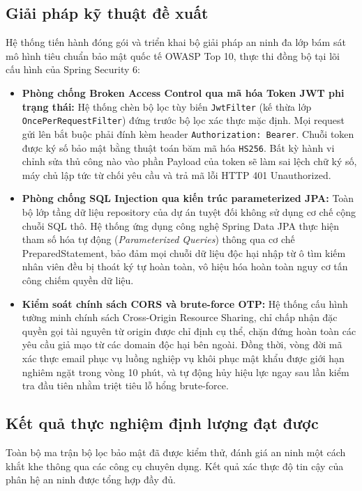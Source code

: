 \documentclass[../DoAn.tex]{subfiles}
\begin{document}
\subsection{Giải pháp kỹ thuật đề xuất}

Hệ thống tiến hành đóng gói và triển khai bộ giải pháp an ninh đa lớp bám sát mô hình tiêu chuẩn bảo mật quốc tế OWASP Top 10, thực thi đồng bộ tại lõi cấu hình của Spring Security 6:
\begin{itemize}
    \item \textbf{Phòng chống Broken Access Control qua mã hóa Token JWT phi trạng thái:} Hệ thống chèn bộ lọc tùy biến \texttt{JwtFilter} (kế thừa lớp \texttt{OncePerRequestFilter}) đứng trước bộ lọc xác thực mặc định. Mọi request gửi lên bắt buộc phải đính kèm header \texttt{Authorization: Bearer}. Chuỗi token được ký số bảo mật bằng thuật toán băm mã hóa \texttt{HS256}. Bất kỳ hành vi chỉnh sửa thủ công nào vào phần Payload của token sẽ làm sai lệch chữ ký số, máy chủ lập tức từ chối yêu cầu và trả mã lỗi HTTP 401 Unauthorized.
    \item \textbf{Phòng chống SQL Injection qua kiến trúc parameterized JPA:} Toàn bộ lớp tầng dữ liệu repository của dự án tuyệt đối không sử dụng cơ chế cộng chuỗi SQL thô. Hệ thống ứng dụng công nghệ Spring Data JPA thực hiện tham số hóa tự động (\textit{Parameterized Queries}) thông qua cơ chế PreparedStatement, bảo đảm mọi chuỗi dữ liệu độc hại nhập từ ô tìm kiếm nhân viên đều bị thoát ký tự hoàn toàn, vô hiệu hóa hoàn toàn nguy cơ tấn công chiếm quyền dữ liệu.
    \item \textbf{Kiểm soát chính sách CORS và brute-force OTP:} Hệ thống cấu hình tường minh chính sách Cross-Origin Resource Sharing, chỉ chấp nhận đặc quyền gọi tài nguyên từ origin được chỉ định cụ thể, chặn đứng hoàn toàn các yêu cầu giả mạo từ các domain độc hại bên ngoài. Đồng thời, vòng đời mã xác thực email phục vụ luồng nghiệp vụ khôi phục mật khẩu được giới hạn nghiêm ngặt trong vòng 10 phút, và tự động hủy hiệu lực ngay sau lần kiểm tra đầu tiên nhằm triệt tiêu lỗ hổng brute-force.
\end{itemize}

\subsection{Kết quả thực nghiệm định lượng đạt được}

Toàn bộ ma trận bộ lọc bảo mật đã được kiểm thử, đánh giá an ninh một cách khắt khe thông qua các công cụ chuyên dụng. Kết quả xác thực độ tin cậy của phân hệ an ninh được tổng hợp đầy đủ.
\end{document}
